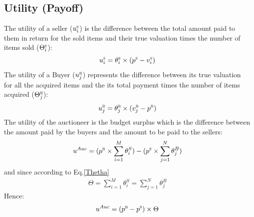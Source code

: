 \subsection{Utility (Payoff)}
The utility of a seller ($u_{i}^\textsc{s}$) is the difference between the total amount paid to them in return for the sold items and their true valuation times the number of items sold ($\Theta_{i}^\textsc{s}$):
\begin{equation}
\label{seller_utility_formula}
u_{i}^\textsc{s} = {\theta_{i}^\textsc{s}}  \times (p^\textsc{s} - {v_{i}^\textsc{s}})
\end{equation}
The utility of a Buyer ($u_{j}^\textsc{b}$) represents the difference between its true valuation for all the acquired items and the its total payment times the number of items acquired ($\Theta_{j}^\textsc{b}$):
\begin{equation}
\label{buyer-utility-formula}
u_{j}^\textsc{b} = {\theta_{j}^\textsc{b}}  \times ({v_{j}^\textsc{b}}-p^\textsc{b})
\end{equation}
The utility of the auctioneer is the budget surplus which is the difference between the amount paid by the buyers and the amount to be paid to the sellers:
\begin{equation}
\label{util-auc}
u^{Auc} = (p^\textsc{b} \times \sum_{i=1}^{M} \theta_i^S) - (p^\textsc{s} \times \sum_{j=1}^{N} \theta_j^B)
\end{equation}
and since according to Eq.\ref{Thetha}
\begin{eqnarray*}
\Theta = \sum_{i=1}^{M} \theta_i^S = \sum_{j=1}^{N} \theta_j^B
\end{eqnarray*}
Hence:
\begin{eqnarray}
u^{Auc} = (p^\textsc{b} - p^\textsc{s}) \times \Theta
\end{eqnarray}




